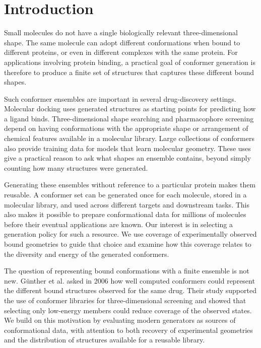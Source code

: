 \section{Introduction}
\label{sec:introduction}

Small molecules do not have a single biologically relevant three-dimensional shape. The same
molecule can adopt different conformations when bound to different proteins, or even in different
complexes with the same protein.\cite{friedrich2018diversity} For applications involving protein binding, a practical goal of
conformer generation is therefore to produce a finite set of structures that captures these
different bound shapes.

Such conformer ensembles are important in several drug-discovery settings. Molecular docking uses
generated structures as starting points for predicting how a ligand binds.\cite{mcnutt2023conformers} Three-dimensional shape
searching and pharmacophore screening depend on having conformations with the appropriate shape or
arrangement of chemical features available in a molecular library. Large collections of conformers
also provide training data for models that learn molecular geometry.\cite{axelrod2022geom} These uses give a practical
reason to ask what shapes an ensemble contains, beyond simply counting how many structures were
generated.

Generating these ensembles without reference to a particular protein makes them reusable. A
conformer set can be generated once for each molecule, stored in a molecular library, and used
across different targets and downstream tasks. This also makes it possible to prepare conformational
data for millions of molecules before their eventual applications are known. Our interest is in
selecting a generation policy for such a resource. We use coverage of experimentally observed bound
geometries to guide that choice and examine how this coverage relates to the diversity and energy of
the generated conformers.

The question of representing bound conformations with a finite ensemble is not new. G{\"u}nther et
al.\cite{gunther2006representation} asked in 2006 how well computed conformers could represent the different bound structures
observed for the same drug. Their study supported the use of conformer libraries for
three-dimensional screening and showed that selecting only low-energy members could reduce coverage
of the observed states. We build on this motivation by evaluating modern generators as sources of
conformational data, with attention to both recovery of experimental geometries and the distribution
of structures available for a reusable library.

